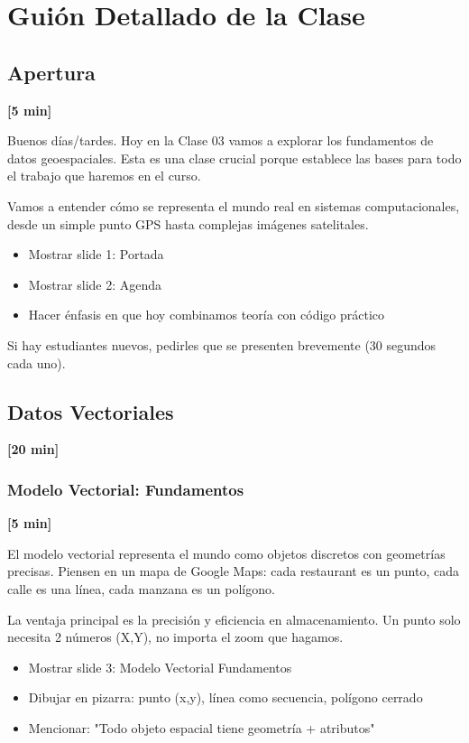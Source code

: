 \documentclass[11pt,a4paper]{article}
\newcommand{\tiempo}[1]{\textcolor{timecolor}{\textbf{[#1]}}}
\newcommand{\decir}[1]{\begin{tcolorbox}[colback=blue!5,colframe=usachblue,title={DECIR}]#1\end{tcolorbox}}
\newcommand{\hacer}[1]{\begin{tcolorbox}[colback=green!5,colframe=green!50!black,title={HACER}]#1\end{tcolorbox}}
\newcommand{\nota}[1]{\begin{tcolorbox}[colback=yellow!10,colframe=orange,title={NOTA}]#1\end{tcolorbox}}
\begin{document}
\newpage

\section{Guión Detallado de la Clase}

\subsection{Apertura} \tiempo{5 min}

\decir{
Buenos días/tardes. Hoy en la Clase 03 vamos a explorar los fundamentos de datos geoespaciales. Esta es una clase crucial porque establece las bases para todo el trabajo que haremos en el curso.

Vamos a entender cómo se representa el mundo real en sistemas computacionales, desde un simple punto GPS hasta complejas imágenes satelitales.
}

\hacer{
\begin{itemize}
    \item Mostrar slide 1: Portada
    \item Mostrar slide 2: Agenda
    \item Hacer énfasis en que hoy combinamos teoría con código práctico
\end{itemize}
}

\nota{
Si hay estudiantes nuevos, pedirles que se presenten brevemente (30 segundos cada uno).
}

\subsection{Datos Vectoriales} \tiempo{20 min}

\subsubsection{Modelo Vectorial: Fundamentos} \tiempo{5 min}

\decir{
El modelo vectorial representa el mundo como objetos discretos con geometrías precisas. Piensen en un mapa de Google Maps: cada restaurant es un punto, cada calle es una línea, cada manzana es un polígono.

La ventaja principal es la precisión y eficiencia en almacenamiento. Un punto solo necesita 2 números (X,Y), no importa el zoom que hagamos.
}

\hacer{
\begin{itemize}
    \item Mostrar slide 3: Modelo Vectorial Fundamentos
    \item Dibujar en pizarra: punto (x,y), línea como secuencia, polígono cerrado
    \item Mencionar: "Todo objeto espacial tiene geometría + atributos"
\end{itemize}
}
\end{document}
